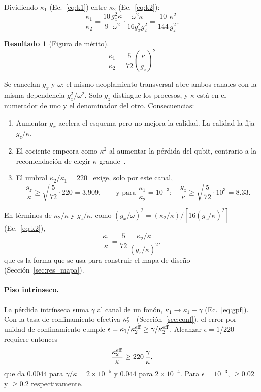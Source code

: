 \documentclass[11pt,a4paper]{article}
\theoremstyle{definition}
\newtheorem{resultado}{Resultado}
\begin{document}
\label{sec:merito}

Dividiendo $\kappa_1$ (Ec.~\eqref{eq:k1}) entre $\kappa_2$ (Ec.~\eqref{eq:k2}):
\begin{equation}
\frac{\kappa_1}{\kappa_2}=\frac{10}{9}\frac{g_x^2\kappa}{\omega^2}\cdot\frac{\omega^2\kappa}{16g_x^2g_z^2}=\frac{10}{144}\frac{\kappa^2}{g_z^2}.
\end{equation}
\begin{resultado}[Figura de mérito]
\begin{equation}
\boxed{\frac{\kappa_1}{\kappa_2}=\frac{5}{72}\left(\frac{\kappa}{g_z}\right)^2}
\label{eq:merito}
\end{equation}
\end{resultado}
Se cancelan $g_x$ y $\omega$: el mismo acoplamiento transversal abre ambos canales con la misma dependencia $g_x^2/\omega^2$. Solo $g_z$ distingue los procesos, y $\kappa$ está en el numerador de uno y el denominador del otro. Consecuencias:
\begin{enumerate}
\item Aumentar $g_x$ acelera el esquema pero no mejora la calidad. La calidad la fija $g_z/\kappa$.
\item El cociente empeora como $\kappa^2$ al aumentar la pérdida del qubit, contrario a la recomendación de elegir $\kappa$ grande~\cite{Naseem2026}.
\item El umbral $\kappa_2/\kappa_1=220$~\cite{GuillaudMirrahimi2021} exige, solo por este canal,
\begin{equation}
\frac{g_z}{\kappa}\geq\sqrt{\frac{5}{72}\cdot220}=3.909,\qquad\text{y para }\frac{\kappa_1}{\kappa_2}=10^{-3}:\quad\frac{g_z}{\kappa}\geq\sqrt{\frac{5}{72}\cdot10^{3}}=8.33.
\end{equation}
\end{enumerate}
En términos de $\kappa_2/\kappa$ y $g_z/\kappa$, como $(g_x/\omega)^2=(\kappa_2/\kappa)/[16(g_z/\kappa)^2]$ (Ec.~\eqref{eq:k2}),
\begin{equation}
\frac{\kappa_1}{\kappa}=\frac{5}{72}\,\frac{\kappa_2/\kappa}{(g_z/\kappa)^2},
\label{eq:k1k}
\end{equation}
que es la forma que se usa para construir el mapa de diseño (Sección~\ref{sec:res_mapa}).

\paragraph{Piso intrínseco.} La pérdida intrínseca suma $\gamma$ al canal de un fonón, $\kappa_1\to\kappa_1+\gamma$ (Ec.~\eqref{eq:gpf}). Con la tasa de confinamiento efectiva $\kappa_2^{\rm eff}$ (Sección~\ref{sec:conf}), el error por unidad de confinamiento cumple $\epsilon=\kappa_1/\kappa_2^{\rm eff}\geq\gamma/\kappa_2^{\rm eff}$. Alcanzar $\epsilon=1/220$ requiere entonces
\begin{equation}
\frac{\kappa_2^{\rm eff}}{\kappa}\geq220\,\frac{\gamma}{\kappa},
\end{equation}
que da $0.0044$ para $\gamma/\kappa=2\times10^{-5}$ y $0.044$ para $2\times10^{-4}$. Para $\epsilon=10^{-3}$, $\geq0.02$ y $\geq0.2$ respectivamente.
\end{document}
